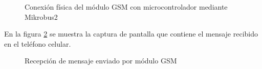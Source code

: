 	\begin{figure}[htbp!]
		\centering
		\caption{Conexión física del módulo GSM con microcontrolador mediante Mikrobus2}
		\label{fig:ConexionFisicaGSM}
	\end{figure}
	
En la figura \ref{fig:RecepcionMsj} se muestra la captura de pantalla que contiene el mensaje recibido en el teléfono celular.

	\begin{figure}[htbp!]
		\centering
		\caption{Recepción de mensaje enviado por módulo GSM}
		\label{fig:RecepcionMsj}
	\end{figure}
